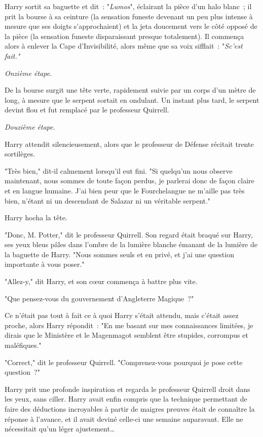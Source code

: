 Harry sortit sa baguette et dit~: "\emph{Lumos}", éclairant la pièce d'un halo blanc~; il prit la bourse à sa ceinture (la sensation funeste devenant un peu plus intense à mesure que ses doigts s'approchaient) et la jeta doucement vers le côté opposé de la pièce (la sensation funeste disparaissant presque totalement). Il commença alors à enlever la Cape d'Invisibilité, alors même que sa voix sifflait~: "\emph{Sc'est fait."}

\emph{Onzième étape.}

De la bourse surgit une tête verte, rapidement suivie par un corps d'un mètre de long, à mesure que le serpent sortait en ondulant. Un instant plus tard, le serpent devint flou et fut remplacé par le professeur Quirrell.

\emph{Douzième étape.}

Harry attendit silencieusement, alors que le professeur de Défense récitait trente sortilèges.

"Très bien," dit-il calmement lorsqu'il eut fini. "Si quelqu'un nous observe maintenant, nous sommes de toute façon perdus, je parlerai donc de façon claire et en langue humaine. J'ai bien peur que le Fourchelangue ne m'aille pas très bien, n'étant ni un descendant de Salazar ni un véritable serpent."

Harry hocha la tête.

"Donc, M. Potter," dit le professeur Quirrell. Son regard était braqué sur Harry, ses yeux bleus pâles dans l'ombre de la lumière blanche émanant de la lumière de la baguette de Harry. "Nous sommes seuls et en privé, et j'ai une question importante à vous poser."

"Allez-y," dit Harry, et son cœur commença à battre plus vite.

"Que pensez-vous du gouvernement d'Angleterre Magique~?"

Ce n'était pas tout à fait ce à quoi Harry s'était attendu, mais c'était assez proche, alors Harry répondit~: "En me basant sur mes connaissances limitées, je dirais que le Ministère et le Magenmagot semblent être stupides, corrompus et maléfiques."

"Correct," dit le professeur Quirrell. "Comprenez-vous pourquoi je pose cette question~?"

Harry prit une profonde inspiration et regarda le professeur Quirrell droit dans les yeux, sans ciller. Harry avait enfin compris que la technique permettant de faire des déductions incroyables à partir de maigres preuves était de connaître la réponse à l'avance, et il avait deviné celle-ci une semaine auparavant. Elle ne nécessitait qu'un léger ajustement…

